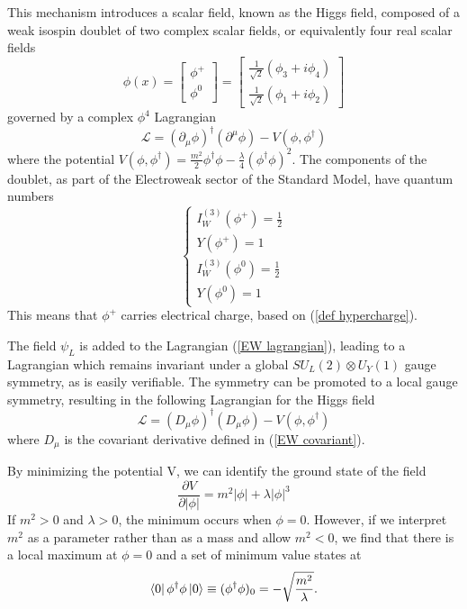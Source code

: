\documentclass[10pt,a4paper]{book}
\begin{document}
This mechanism introduces a scalar field, known as the Higgs field, composed of a weak isospin doublet of two complex scalar fields, or equivalently four real scalar fields
\begin{equation}
\phi(x) = 
\begin{bmatrix}
\phi^+ \\
\phi^0
\end{bmatrix} =
\begin{bmatrix}
\frac{1}{\sqrt{2}}(\phi_3 + i\phi_4) \\
\frac{1}{\sqrt{2}}(\phi_1 + i\phi_2)
\end{bmatrix}
\end{equation} governed by a complex $\phi^4$ Lagrangian 
\begin{equation}
\label{SSB lagrangian}
\mathcal{L} = (\partial_\mu\phi)^\dagger(\partial^\mu\phi) - V(\phi, \phi^\dagger)
\end{equation}
where the potential $V(\phi, \phi^\dagger) = \frac{m^2}{2}\phi^\dagger \phi - \frac{\lambda}{4}(\phi^\dagger\phi)^2$. The components of the doublet, as part of the Electroweak sector of the Standard Model, have quantum numbers 
\begin{equation}
\begin{cases}
I_W^{(3)}(\phi^+) = \frac{1}{2} \\
Y(\phi^+) = 1 \\
I_W^{(3)}(\phi^0) = \frac{1}{2} \\
Y(\phi^0) = 1
\end{cases}
\end{equation}
This means that $\phi^+$ carries electrical charge, based on (\ref{def hypercharge}).

The field $\psi_L$ is added to the Lagrangian (\ref{EW lagrangian}), leading to a Lagrangian which remains invariant under a global $SU_L(2)\otimes U_Y(1)$ gauge symmetry, as is easily verifiable. The symmetry can be promoted to a local gauge symmetry, resulting in the following Lagrangian for the Higgs field
\begin{equation}
\mathcal{L} = (D_\mu\phi)^\dagger(D_\mu\phi) - V(\phi,\phi^\dagger)
\end{equation}
where $D_\mu$ is the covariant derivative defined in (\ref{EW covariant}).


By minimizing the potential V, we can identify the ground state of the field
\begin{equation}
\frac{\partial V}{\partial \vert \phi \vert} = m^2\vert \phi \vert + \lambda\vert\phi\vert^3 
\end{equation}
If $m^2 > 0$ and $\lambda > 0$, the minimum occurs when $\phi = 0$. However, if we interpret $m^2$ as a parameter rather than as a mass and allow $m^2 < 0$, we find that there is a local maximum at $\phi = 0$ and a set of minimum value states at 
\begin{equation}
\bra{0}\phi^\dagger \phi\ket{0} \equiv (\phi^\dagger\phi)_0 = -\sqrt{\frac{m^2}{\lambda}}.
\end{equation}
\end{document}
